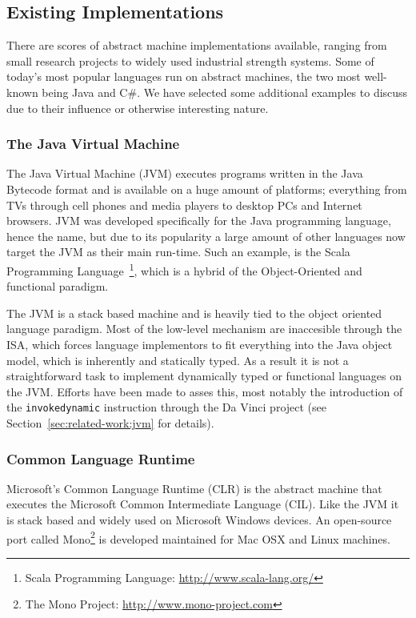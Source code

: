 \subsection{Existing Implementations}

There are scores of abstract machine implementations available, ranging from
small research projects to widely used industrial strength systems. Some of
today's most popular languages run on abstract machines, the two most well-known
being Java and C\#\cite{langpop}. We have selected some additional examples to
discuss due to their influence or otherwise interesting nature.

\subsubsection{The Java Virtual Machine}

The Java Virtual Machine (JVM) executes programs written in the Java Bytecode
format and is available on a huge amount of platforms; everything from TVs
through cell phones and media players to desktop PCs and Internet
browsers\cite{aboutjava}. JVM was developed specifically for the Java
programming language, hence the name, but due to its popularity a large amount
of other languages now target the JVM as their main run-time. Such an example,
is the Scala Programming Language~\footnote{Scala Programming Language:
  \url{http://www.scala-lang.org/}}, which is a hybrid of the Object-Oriented
and functional paradigm.

The JVM is a stack based machine and is heavily tied to the object oriented
language paradigm. Most of the low-level mechanism are inaccesible through the
ISA, which forces language implementors to fit everything into the Java object
model, which is inherently  and statically typed. As a
result it is not a straightforward task to implement dynamically typed or
functional languages on the JVM. Efforts have been made to asses this, most
notably the introduction of the \texttt{invokedynamic} instruction through the
Da Vinci project (see Section~\ref{sec:related-work:jvm} for details).

\subsubsection{Common Language Runtime}

Microsoft's Common Language Runtime (CLR) is the abstract machine that executes
the Microsoft Common Intermediate Language (CIL). Like the JVM it is stack based
and widely used on Microsoft Windows devices. An open-source port called
Mono\footnote{The Mono Project: \url{http://www.mono-project.com}} is developed
maintained for Mac OSX and Linux machines.


